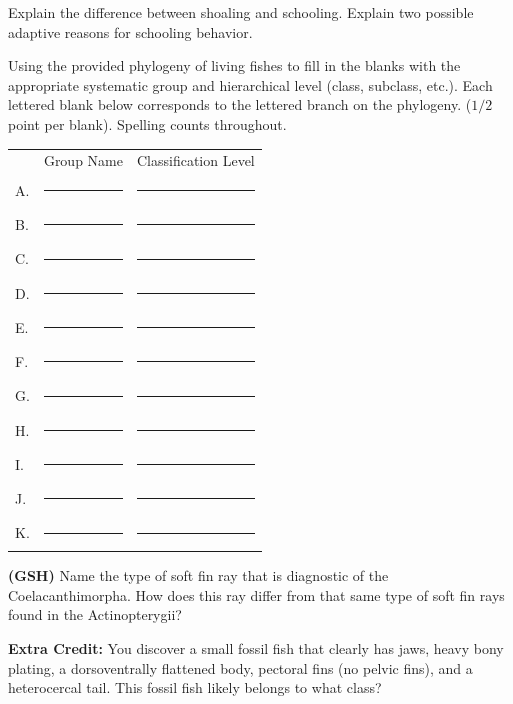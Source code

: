 \question{}
\vspace{0.5\baselineskip}


\question[15]
Explain the difference between shoaling and schooling.  Explain two possible adaptive reasons for schooling behavior.

	\begin{solution}
	\end{solution}


\question[11]
Using the provided phylogeny of living fishes to fill in the blanks with the appropriate systematic group and hierarchical level (class, subclass, etc.).  Each lettered blank below corresponds to the lettered branch on the phylogeny. ($1/2$ point per blank). Spelling counts throughout.\vspace{\baselineskip}

\begin{tabular}{@{}lll@{}}
	&	\multicolumn{1}{c}{Group Name}		& 	\multicolumn{1}{c}{Classification Level} \\[1.5em]
A.	& 	\rule{2.75in}{0.4pt}	&	\rule{2.75in}{0.4pt} \\[1.5em]
B.	& 	\rule{2.75in}{0.4pt}	&	\rule{2.75in}{0.4pt} \\[1.5em]
C.	& 	\rule{2.75in}{0.4pt}	&	\rule{2.75in}{0.4pt} \\[1.5em]
D.	& 	\rule{2.75in}{0.4pt}	&	\rule{2.75in}{0.4pt} \\[1.5em]
E.	& 	\rule{2.75in}{0.4pt}	&	\rule{2.75in}{0.4pt} \\[1.5em]
F.	& 	\rule{2.75in}{0.4pt}	&	\rule{2.75in}{0.4pt} \\[1.5em]
G.	& 	\rule{2.75in}{0.4pt}	&	\rule{2.75in}{0.4pt} \\[1.5em]
H.	& 	\rule{2.75in}{0.4pt}	&	\rule{2.75in}{0.4pt} \\[1.5em]
I.	& 	\rule{2.75in}{0.4pt}	&	\rule{2.75in}{0.4pt} \\[1.5em]
J.	& 	\rule{2.75in}{0.4pt}	&	\rule{2.75in}{0.4pt} \\[1.5em]
K.	& 	\rule{2.75in}{0.4pt}	&	\rule{2.75in}{0.4pt} \\[1.5em]
\end{tabular}

\textbf{(GSH)} Name the type of soft fin ray that is diagnostic of the Coelacanthimorpha. How does this ray differ from that same type of soft fin rays found in the Actinopterygii?

\question[2]
\textbf{Extra Credit:} You discover a small fossil fish that clearly has jaws, heavy bony plating, a dorsoventrally flattened body, pectoral fins (no pelvic fins), and a heterocercal tail.  This fossil fish likely belongs to what class?

